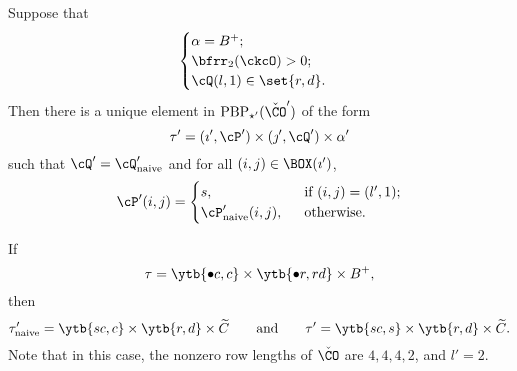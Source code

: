 \documentclass[ssunip]{subfiles}
\begin{document}
\begin{lem}\label{descb2}
  Suppose that 
\[  \begin{cases}
 \alpha = B^+; & \\
 \bfrr_2(\ckcO)>0; & \\
 \cQ(l,1)\in \set{r,d}.
\end{cases}
\]
 Then there is a unique element in $\mathrm{PBP}_{\star'}(\check \CO')$ of the form
  \[
      \tau'=(\imath', \cP')\times (\jmath', \cQ')\times \alpha'
  \]
 such that 
     $
     \cQ' = \cQ'_{\mathrm{naive}}
     $
     and
     for all $(i,j)\in \BOX(\imath')$, 
\[
\cP'(i,j) = \begin{cases}
  s, & \ \text{ if $(i,j) = (l',1)$;}\\
  \cP'_{\mathrm{naive}}(i,j), & \ \text{ otherwise}.
\end{cases}
\]
\end{lem}

\begin{Example}
 If 
 \[
 \tau= \ytb{\bullet c, c} \times \ytb{\bullet r, rd}\times 
  B^+,
 \]
 then 
\[
 \tau'_{\mathrm{naive}}= \ytb{s c, c} \times \ytb{r, d}\times 
  \widetilde C\qquad\textrm{and}\qquad \tau'= \ytb{s c, s} \times \ytb{r, d}\times 
  \widetilde C.
 \]
 Note that in this case, the nonzero row lengths of $\check \CO$ are $4,4,4,2$, and $l'=2$.
\end{Example}
\end{document}
